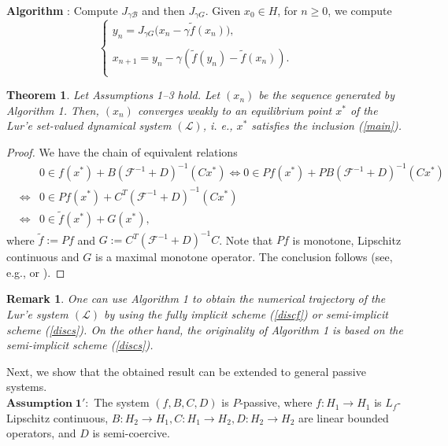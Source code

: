 \documentclass[11pt]{article}
\def\beq{\begin{equation}}
\def\eeq{\end{equation}}
\def\baqn{\begin{eqnarray*}}
\def\eaqn{\end{eqnarray*}}
\theoremstyle{plain}
\newtheorem{remark}{Remark}
\newtheorem{theorem}{Theorem}
\begin{document}
{ \noindent \textbf{Algorithm }: Compute $J_{\gamma \mathcal{B}}$ and then $J_{\gamma G}$. Given $x_0\in H$, for $n\ge 0$, we compute \\
 \beq \left\{
\begin{array}{lll}
 y_{n}=J_{\gamma G}\Big(x_n- \gamma \tilde{f}(x_n)\Big),\\
&&\\
x_{n+1}= y_n- \gamma (\tilde{f}(y_n)-\tilde{f}(x_n)). \\
\end{array}\right. \label{sysh}
\eeq

 \begin{theorem}\label{mthe}
  Let Assumptions 1--3 hold. Let $(x_n)$ be the sequence generated by  Algorithm 1. Then, $(x_n)$ converges weakly to an equilibrium point $x^*$ of the Lur'e set-valued dynamical system $({\mathcal L})$, i. e., $x^*$ satisfies  the inclusion  (\ref{main}).
 \end{theorem}
  \begin{proof}
We have the chain of equivalent relations
  \baqn
&&0 \in f(x^*)+B(\mathcal{F}^{-1}+D)^{-1}(Cx^*) \Leftrightarrow 0 \in Pf(x^*)+PB(\mathcal{F}^{-1}+D)^{-1}(Cx^*)\\
&\Leftrightarrow& 0 \in Pf(x^*)+C^T(\mathcal{F}^{-1}+D)^{-1}(Cx^*)\\
&\Leftrightarrow& 0 \in {{\tilde{f}(x^*)+G(x^*),}}
\eaqn
where $\tilde{f}:= Pf$ and $G:={C}^T(\mathcal{F}^{-1}+D)^{-1} {C}$. Note that $Pf$ is monotone, Lipschitz continuous and $G$ is a maximal monotone operator. The conclusion follows (see, e.g.,  \cite[Theorem 3.6]{Shehu} or \cite[Theorem 3.4]{Tseng}). 
 \end{proof}
   \begin{remark}
 One can use Algorithm 1 to obtain the numerical trajectory of the Lur'e system $(\mathcal{L})$ by using the fully implicit scheme (\ref{discf}) or semi-implicit scheme (\ref{discs}). On the other hand, the originality of Algorithm 1 is based on the semi-implicit scheme (\ref{discs}).
   \end{remark}
   Next, we show that the obtained result can be extended to general passive systems. \\
   
   \noindent$\mathbf{Assumption \;1'}:$  The system $(f,B,C,D)$ is $P$-passive, where $ f: H_1 \to H_1$ is $L_f$-Lipschitz continuous,   $B:{H_2\to H_1}, C: {H_1\to H_2}, D: {H_2\to H_2}$ are linear bounded operators, and $D$ is semi-coercive.  \\
   
}
\end{document}
